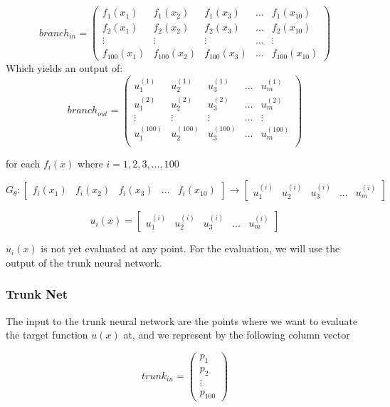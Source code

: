 \documentclass[a4paper, onecolumn, 12pt]{article}
\begin{document}
$$
branch_{in} =
\begin{pmatrix}
f_1(x_1) & f_1(x_2) & f_1(x_3) & \dots & f_1(x_{10})\\
f_2(x_1) & f_2(x_2) & f_2(x_3) & \dots & f_2(x_{10})\\
\vdots & \vdots & \vdots & \dots & \vdots\\
f_{100}(x_1) & f_{100}(x_2) & f_{100}(x_3) & \dots & f_{100}(x_{10})
\end{pmatrix}
$$
Which yields an output of: 
$$
branch_{out} = \begin{pmatrix}
u^{(1)}_1 & u^{(1)}_2 & u^{(1)}_3 & \dots & u^{(1)}_m\\
u^{(2)}_1 & u^{(2)}_2 & u^{(2)}_3 & \dots & u^{(2)}_m\\
\vdots & \vdots & \vdots & \dots & \vdots\\
u^{(100)}_1 & u^{(100)}_2 & u^{(100)}_3 & \dots & u^{(100)}_m\\
\end{pmatrix}
$$


for each $f_i(x)$ where $i=1, 2, 3, \dots, 100$


$$
G_{\theta}:
\begin{bmatrix}
f_i(x_1) & f_i(x_2) & f_i(x_3) & \dots & f_i(x_{10})
\end{bmatrix}
\rightarrow
\begin{bmatrix}
u^{(i)}_1 & u^{(i)}_2 & u^{(i)}_3 & \dots & u^{(i)}_m
\end{bmatrix}
$$

$$
u_i(x) =
\begin{bmatrix}
u^{(i)}_1 & u^{(i)}_2 & u^{(i)}_3 & \dots & u^{(i)}_m
\end{bmatrix}
$$

$u_i(x)$ is not yet evaluated at any point. 
For the evaluation, we will use the output of the trunk neural network.

\subsubsection{Trunk Net}
The input to the trunk neural network are the points where we want to 
evaluate the target function $u(x)$ at, and we represent by the following column vector

$$
trunk_{in} =
\begin{pmatrix}
p_1 \\
p_2 \\
\vdots \\
p_{100}
\end{pmatrix}
$$
\end{document}
